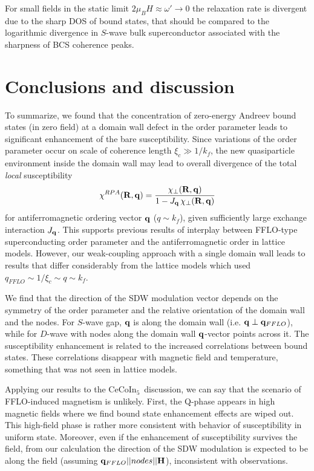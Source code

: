 \documentclass[prb,aps,showpacs,amsmath,twocolumn,10pt]{revtex4-1}
\newcommand{\cecoin}{CeCoIn$_5$}
\begin{document}
For small fields in the static limit $2\mu_B H \approx \omega' \to 0$ the 
relaxation rate is divergent due to the sharp DOS of bound states, 
that should be compared to the 
logarithmic divergence in $S$-wave bulk superconductor associated with 
the sharpness of BCS coherence peaks.\cite{tinkham}

\section{Conclusions and discussion}
\label{sec:concl}
%

To summarize, we found that the concentration of zero-energy Andreev bound states (in zero field) at a domain wall 
defect in the order parameter leads to significant enhancement of the bare 
susceptibility. Since variations of the order parameter occur on scale of coherence length $\xi_c \gg 1/k_f$, 
the new quasiparticle environment inside the domain wall may lead to overall divergence of the total 
\emph{local} susceptibility
$$
\chi^{RPA}({\bf R},{\bf q}) = \frac{ \chi_\perp({\bf R},{\bf q})}{1 - J_{\bf q} \, \chi_\perp({\bf R},{\bf q}) }
$$
for antiferromagnetic ordering vector ${\bf q}$ ($q \sim k_f$), given sufficiently 
large exchange interaction $J_{\bf q}$. This supports previous results of interplay between FFLO-type  
superconducting order parameter and the antiferromagnetic order in lattice models.\cite{Yanase2009abs,Marcin2009}
However, our weak-coupling approach with a single domain wall leads to results that differ 
considerably from the lattice models which used $q_{FFLO} \sim 1/\xi_c \sim q \sim k_f$. 

We find that the direction of the SDW modulation vector depends on the symmetry of 
the order parameter and the relative orientation of the domain wall and the nodes. 
For $S$-wave gap, ${\bf q}$ is along the domain wall (i.e. ${\bf q} \perp {\bf q}_{FFLO}$), 
while for $D$-wave with nodes along the domain wall ${\bf q}$-vector points across it.
The susceptibility enhancement is related to the increased correlations between 
bound states. 
These correlations disappear with magnetic field and temperature, something that was not seen in lattice models. 

Applying our results to the \cecoin\ discussion, we can say that the scenario of FFLO-induced magnetism 
is unlikely. First, the Q-phase appears in high magnetic fields\cite{cecoin5_Kenzelmann, cecoin5_Kenzelmann2} 
where we find bound state enhancement effects are wiped out. 
This high-field phase is rather more consistent with behavior of susceptibility in uniform state.\cite{sc_afm_kato,Rosemeyer2014} 
Moreover, even if the enhancement of susceptibility survives the field, 
from our calculation the direction of the SDW modulation is expected to be along the field 
(assuming ${\bf q}_{FFLO} || nodes || {\bf H}$), inconsistent with observations.\cite{Gerber2014}
\end{document}

